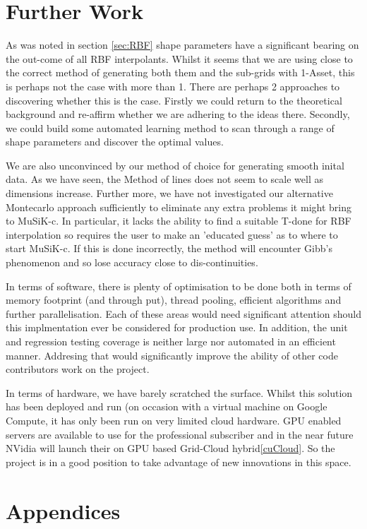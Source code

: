 \documentclass[a4paper]{amsart}
\begin{document}
\section {Further Work}

As was noted in section \ref{sec:RBF} shape parameters have a significant bearing on the out-come of all RBF interpolants. Whilst it seems that we are using close to the correct method of generating both them and the sub-grids with 1-Asset, this is perhaps not the case with more than 1. There are perhaps 2 approaches to discovering whether this is the case. Firstly we could return to the theoretical background and re-affirm whether we are adhering to the ideas there. Secondly, we could build some automated learning method to scan through a range of shape parameters and discover the optimal values.

We are also unconvinced by our method of choice for generating smooth inital data. As we have seen, the Method of lines does not seem to scale well as dimensions increase. Further more, we have not investigated our alternative Montecarlo approach sufficiently to eliminate any extra problems it might bring to MuSiK-c. In particular, it lacks the ability to find a suitable T-done for RBF interpolation so requires the user to make an 'educated guess' as to where to start MuSiK-c. If this is done incorrectly, the method will encounter Gibb's phenomenon and so lose accuracy close to dis-continuities.

In terms of software, there is plenty of optimisation to be done both in terms of memory footprint (and through put), thread pooling, efficient algorithms and further parallelisation. Each of these areas would need significant attention should this implmentation ever be considered for production use. In addition, the unit and regression testing coverage is neither large nor automated in an efficient manner. Addresing that would significantly improve the ability of other code contributors work on the project.

In terms of hardware, we have barely scratched the surface. Whilst this solution has been deployed and run (on occasion with a virtual machine on Google Compute, it has only been run on very limited cloud hardware. GPU enabled servers are available to use for the professional subscriber and in the near future NVidia will launch their on GPU based Grid-Cloud hybrid\ref{cuCloud}. So the project is in a good position to take advantage of new innovations in this space.

\newpage
\section{Appendices}
\end{document}
